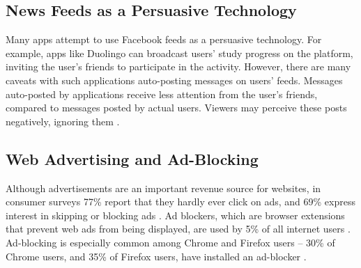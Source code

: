 \documentclass{sigchi}
\begin{document}


\subsection{News Feeds as a Persuasive Technology}

Many apps attempt to use Facebook feeds as a persuasive technology. For example, apps like Duolingo can broadcast users' study progress on the platform, inviting the user's friends to participate in the activity. However, there are many caveats with such applications auto-posting messages on users' feeds. Messages auto-posted by applications receive less attention from the user's friends, compared to messages posted by actual users. Viewers may perceive these posts negatively, ignoring them \cite{socialsharing}.

\pagebreak

\subsection{Web Advertising and Ad-Blocking}

Although advertisements are an important revenue source for websites, in consumer surveys 77\% report that they hardly ever click on ads, and 69\% express interest in skipping or blocking ads \cite{adblockinggames}. Ad blockers, which are browser extensions that prevent web ads from being displayed, are used by 5\% of all internet users \cite{adblockinggoesmainstream}. Ad-blocking is especially common among Chrome and Firefox users -- 30\% of Chrome users, and 35\% of Firefox users, have installed an ad-blocker \cite{adblockinggoesmainstream}. %
\end{document}
